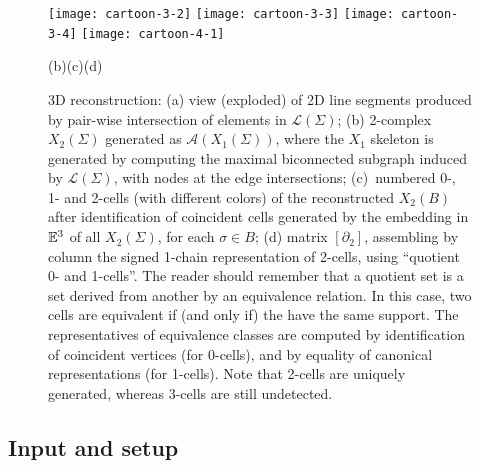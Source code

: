 \begin{figure}[htbp]
   
   
   \vspace{3mm}

\texttt{[image: cartoon-3-2]}\hfill%
\texttt{[image: cartoon-3-3]}\hfill%
\texttt{[image: cartoon-3-4]}\hfill%
\texttt{[image: cartoon-4-1]}%


\vspace{-1.5mm}
{\footnotesize\hspace{.12\textwidth}{(a)}\hfill(b)\hfill(c)\hfill(d)\hspace{.12\textwidth}}
\vspace{-3.5mm}
   \caption{ 3D reconstruction: 
   (a) view (exploded) of 2D line segments produced by pair-wise intersection of elements in $\mathcal{L}({\Sigma})$; 
   (b) 2-complex $X_2({\Sigma})$ generated as $\mathcal{A}(X_1({\Sigma}))$, where { the $X_1$ skeleton is generated by computing} the maximal biconnected subgraph {induced by $\mathcal{L}({\Sigma})$}, with nodes at the edge intersections; 
   (c)~numbered 0-, 1- and 2-cells (with different colors) of the reconstructed $X_2(B)$ after identification of coincident cells generated by the embedding in $\mathbb{E}^3$ of all $X_2({\Sigma})$, for each $\sigma\in B$;
   (d) matrix $[\partial_2]$, assembling by column the signed 1-chain representation of 2-cells, {using ``quotient 0- and 1-cells''}. {The reader should remember that a quotient set is a set derived from another by an equivalence relation. In this case, two cells are equivalent if (and only if) the have the same support. The representatives of equivalence classes are computed by identification of coincident vertices (for 0-cells), and  by equality of canonical representations (for 1-cells).}
   Note that {2-cells are uniquely generated, whereas} 3-cells are still undetected. 
   \label{fig:cartoon-3} }
   
\end{figure}

\subsection{Input and setup}

